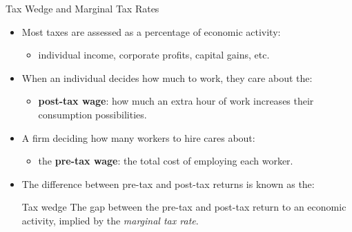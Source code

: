 \documentclass[aspectratio=169]{beamer}
\begin{document}
\begin{frame}{Tax Wedge and Marginal Tax Rates}
\transfade
\begin{itemize}
  \item Most taxes are assessed as a percentage of economic activity:
  \begin{itemize}
    \item individual income, corporate profits, capital gains, etc.
  \end{itemize}
  \item When an individual decides how much to work, they care about the:
  \begin{itemize}
    \item \textbf{post-tax wage}: how much an extra hour of work increases their consumption possibilities.
  \end{itemize}
  \item A firm deciding how many workers to hire cares about:
  \begin{itemize}
    \item the \textbf{pre-tax wage}: the total cost of employing each worker.
  \end{itemize}
  \item The difference between pre-tax and post-tax returns is known as the:
  \begin{block}{Tax wedge}
    The gap between the pre-tax and post-tax return to an economic activity, implied by the \emph{marginal tax rate}.
  \end{block}
\end{itemize}
\end{frame}
\end{document}
